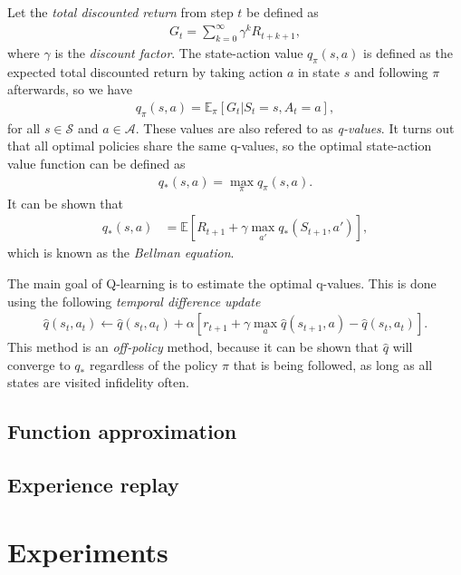 \documentclass{article}
\theoremstyle{definition}
\theoremstyle{plain}
\begin{document}
Let the \textit{total discounted return} from step $t$ be defined as
\begin{align}
  G_{t} = \sum_{k=0}^{\infty} \gamma^{k} R_{t+k+1} ,
\end{align}
where $\gamma$ is the \textit{discount factor}. The state-action value
$q_{\pi}(s, a)$ is defined as the expected total discounted return by taking
action $a$ in state $s$ and following $\pi$ afterwards, so we have
\begin{align}
  q_\pi(s,a) = \mathbb{E}_{\pi}[ G_{t} | S_{t} = s, A_{t} = a ] ,
\end{align}
for all $s \in \mathcal{S}$ and $a \in \mathcal{A}$. These values are also
refered to as \textit{q-values}. It turns out that all optimal policies share
the same q-values, so the optimal state-action value function can be defined as
\begin{align}
  q_{*}(s, a) = \max_{\pi} q_{\pi}(s, a) .
\end{align}
It can be shown that
\begin{align}
  q_{*}(s, a) &= \mathbb{E} \left[ R_{t+1} + \gamma \max_{a'} q_{*}(S_{t+1}, a') \right] ,
\end{align}
which is known as the \textit{Bellman equation}.

The main goal of Q-learning is to estimate the optimal q-values. This is done using the following \textit{temporal difference update}
\begin{align}
  \hat{q}(s_{t}, a_{t}) \leftarrow  \hat{q}(s_{t}, a_{t}) + \alpha [ r_{t+1} + \gamma \max_{a} \hat{q}(s_{t+1}, a) - \hat{q}(s_{t}, a_{t}) ] .
\end{align}
This method is an \textit{off-policy} method, because it can be shown that
$\hat{q}$ will converge to $q_{*}$ regardless of the policy $\pi$ that is being
followed, as long as all states are visited infidelity often.

\subsection{Function approximation}


\subsection{Experience replay}


\section{Experiments}
\end{document}
